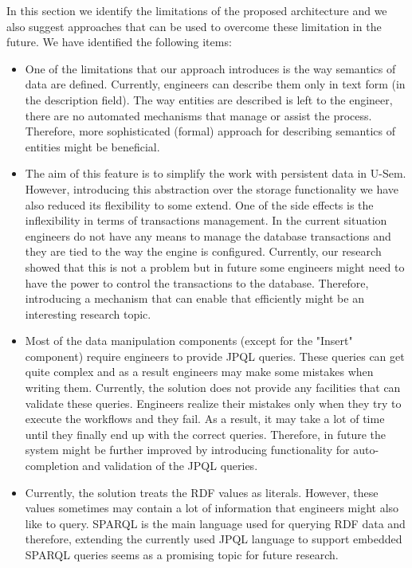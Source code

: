 In this section we identify the limitations of the proposed architecture and we also suggest approaches that can be used to overcome these limitation in the future. We have identified the following items:

\begin{itemize}
\item One of the limitations that our approach introduces is the way semantics of data are defined. Currently, engineers can describe them only in text form (in the description field). The way entities are described is left to the engineer, there are no automated mechanisms that manage or assist the process. Therefore, more sophisticated (formal) approach for describing semantics of entities might be beneficial.

\item The aim of this feature is to simplify the work with persistent data in U-Sem. However, introducing this abstraction over the storage functionality we have also reduced its flexibility to some extend. One of the side effects is the inflexibility in terms of transactions management. In the current situation engineers do not have any means to manage the database transactions and they are tied to the way the engine is configured. Currently, our research showed that this is not a problem but in future some engineers might need to have the power to control the transactions to the database. Therefore, introducing a mechanism that can enable that efficiently might be an interesting research topic.

\item Most of the data manipulation components (except for the "Insert" component) require engineers to provide JPQL queries. These queries can get quite complex and as a result engineers may make some mistakes when writing them. Currently, the solution does not provide any facilities that can validate these queries. Engineers realize their mistakes only when they try to execute the workflows and they fail. As a result, it may take a lot of time until they finally end up with the correct queries. Therefore, in future the system might be further improved by introducing functionality for auto-completion and validation of the JPQL queries.

\item Currently, the solution treats the RDF values as literals. However, these values sometimes may contain a lot of information that engineers might also like to query. SPARQL is the main language used for querying RDF data \cite{perez2006semantics} and therefore, extending the currently used JPQL language to support embedded SPARQL queries seems as a promising topic for future research.


\end{itemize}
